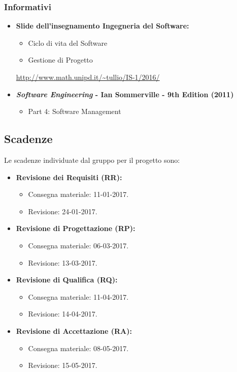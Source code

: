 \subsubsection{Informativi}
\begin{itemize}
\item \textbf{Slide dell'insegnamento Ingegneria del Software:}
\begin{itemize}
\item Ciclo di vita del Software
\item Gestione di Progetto
\end{itemize}
\url{http://www.math.unipd.it/~tullio/IS-1/2016/}
\item \textbf{\textit{Software Engineering} - Ian Sommerville - 9th Edition (2011)}
\begin{itemize}
\item Part 4: Software Management
\end{itemize} 
\end{itemize}

\subsection{Scadenze}
Le scadenze individuate dal gruppo \GroupName{} per il progetto \ProjectName{} sono:
\begin{itemize}
	\item \textbf{Revisione dei Requisiti (RR):}
	\begin{itemize}
		\item Consegna materiale: 11-01-2017.
		\item Revisione: 24-01-2017.
	\end{itemize}
	\item \textbf{Revisione di Progettazione (RP):}
	\begin{itemize}
		\item Consegna materiale: 06-03-2017.
		\item Revisione: 13-03-2017.
	\end{itemize}
	\item \textbf{Revisione di Qualifica (RQ):}
	\begin{itemize}
		\item Consegna materiale: 11-04-2017.
		\item Revisione: 14-04-2017.
	\end{itemize}
	\item \textbf{Revisione di Accettazione (RA):}
	\begin{itemize}
		\item Consegna materiale: 08-05-2017.
		\item Revisione: 15-05-2017.
	\end{itemize}
\end{itemize}

